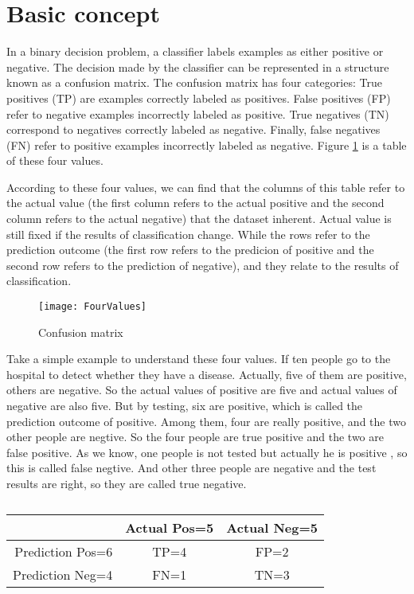 \documentclass[a4paper,12pt]{article}
\begin{document}
\section{Basic concept}
  In a binary decision problem, a classifier labels examples as either positive or negative. The decision made by the classifier can be represented in a structure known as a confusion matrix. The confusion matrix has four categories: True positives (TP) are examples correctly labeled as positives. False positives (FP) refer to negative examples incorrectly labeled as positive. True negatives (TN) correspond to negatives correctly labeled as negative. Finally, false negatives (FN) refer to positive examples incorrectly labeled as negative. Figure \ref{ConfusionMatrix:1} is a table of these four values. 

According to these four values, we can find that the columns of this table refer to the actual value (the first column refers to the actual positive and the second column refers to the actual negative) that the dataset inherent. Actual value is still fixed if the results of classification change. While the rows refer to the prediction outcome (the first row refers to the predicion of positive and the second row refers to the prediction of negative), and they relate to the results of classification.
\begin{figure}[!ht]
\centering\texttt{[image: FourValues]}
\caption{Confusion matrix}\label{ConfusionMatrix:1}
\end{figure} 


Take a simple example to understand these four values. 
If ten people go to the hospital to detect whether they have a disease. Actually, five of them are positive, others are negative. So the actual values of positive are five and actual values of negative are also five. But by testing, six are positive, which is called the prediction outcome of positive. Among them, four are really positive, and the two other people are negtive. So the four people are true positive and the two are false positive. As we know, one people is not tested but actually he is positive , so this is called false negtive. And other three people are negative and the test results are right, so they are called true negative. 

\begin{table}
\centering\caption{}
\begin{tabular}{|r|c|c|}
\hline
&Actual Pos=5&Actual Neg=5\\
\hline
Prediction Pos=6&TP=4&FP=2\\
\hline
Prediction Neg=4&FN=1&TN=3\\
\hline
\end{tabular}
\end{table}
\end{document}
